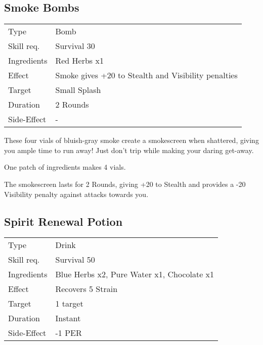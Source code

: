 \documentclass[11pt,a4paper,twocolumn]{book}
\begin{document}
\subsection*{Smoke Bombs}
{
	\begin{tabu} to 75mm{| X[l,4] | X[l,8] |}
		\hline
		Type 			& Bomb 														\\
		Skill req.	    & Survival 30 												\\
		Ingredients     & Red Herbs x1												\\
		Effect     		& Smoke gives +20 to Stealth and Visibility penalties 				\\
		Target      	& Small Splash												\\
		Duration  		& 2 Rounds	 												\\
		Side-Effect     & -															\\ \hline
	\end{tabu}
	
}

\medskip

These four vials of bluish-gray smoke create a smokescreen when shattered, giving you ample time to run away! Just don't trip while making your daring get-away.

One patch of ingredients makes 4 vials.

The smokescreen lasts for 2 Rounds, giving +20 to Stealth and provides a -20 Visibility penalty against attacks towards you.


\subsection*{Spirit Renewal Potion}
{
	\begin{tabu} to 75mm{| X[l,4] | X[l,8] |}
		\hline
		Type 			& Drink 													\\
		Skill req.	    & Survival 50 												\\
		Ingredients     & Blue Herbs x2, Pure Water x1, Chocolate x1				\\
		Effect     		& Recovers 5 Strain 										\\
		Target      	& 1 target													\\
		Duration  		& Instant	 												\\
		Side-Effect     & -1 PER													\\ \hline
	\end{tabu}
	
}
\end{document}
